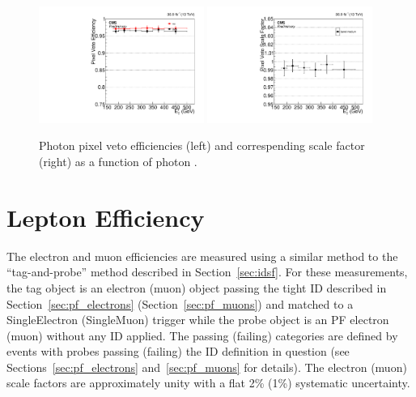 \begin{figure}[htbp]
  \begin{center}
    \includegraphics[width=0.48\textwidth]{Calibration/Figures/pvsf/efficiency_barrel_medium.pdf}
    \includegraphics[width=0.48\textwidth]{Calibration/Figures/pvsf/scalefactor_barrel_medium.pdf}
    \caption{
      Photon pixel veto efficiencies (left) and correspending scale factor (right) as a function of photon \pt.
    }
    \label{fig:pvsf_results}
  \end{center}
\end{figure}

\section{Lepton Efficiency}
\label{sec:lepton_eff}

The electron and muon efficiencies are measured using a similar method to the ``tag-and-probe'' method described in Section~\ref{sec:idsf}.
For these measurements, the tag object is an electron (muon) object passing the tight ID described in Section~\ref{sec:pf_electrons} (Section~\ref{sec:pf_muons}) and matched to a SingleElectron (SingleMuon) trigger while the probe object is an PF electron (muon) without any ID applied.
The passing (failing) categories are defined by events with probes passing (failing) the ID definition in question (see Sections~\ref{sec:pf_electrons} and~\ref{sec:pf_muons} for details).
The electron (muon) scale factors are approximately unity with a flat 2\% (1\%) systematic uncertainty.



